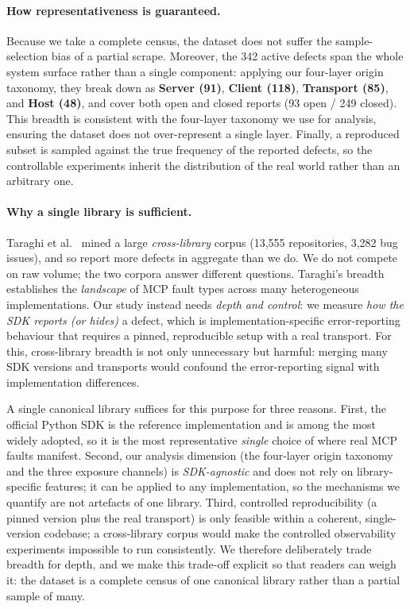 \paragraph{How representativeness is guaranteed.} Because we take a complete census, the
dataset does not suffer the sample-selection bias of a partial scrape. Moreover, the 342
active defects span the whole system surface rather than a single component: applying our
four-layer origin taxonomy, they break down as \textbf{Server (91)}, \textbf{Client (118)},
\textbf{Transport (85)}, and \textbf{Host (48)}, and cover both open and closed reports (93
open / 249 closed). This breadth is consistent with the four-layer taxonomy we use for analysis,
ensuring the dataset does not over-represent a single layer. Finally, a reproduced subset is
sampled against the true frequency of the reported defects, so the controllable experiments
inherit the distribution of the real world rather than an arbitrary one.

\paragraph{Why a single library is sufficient.} Taraghi et al.~\cite{taraghi2026real} mined a
large \emph{cross-library} corpus (13,555 repositories, 3,282 bug issues), and so report more
defects in aggregate than we do. We do not compete on raw volume; the two corpora answer
different questions. Taraghi's breadth establishes the \emph{landscape} of MCP fault types
across many heterogeneous implementations. Our study instead needs \emph{depth and control}: we
measure \emph{how the SDK reports (or hides)} a defect, which is implementation-specific
error-reporting behaviour that requires a pinned, reproducible setup with a real transport.
For this, cross-library breadth is not only unnecessary but harmful: merging many SDK versions
and transports would confound the error-reporting signal with implementation differences.

A single canonical library suffices for this purpose for three reasons. First, the official
Python SDK is the reference implementation and is among the most widely adopted, so it is the
most representative \emph{single} choice of where real MCP faults manifest. Second, our
analysis dimension (the four-layer origin taxonomy and the three exposure channels) is
\emph{SDK-agnostic} and does not rely on library-specific features; it can be applied to any
implementation, so the mechanisms we quantify are not artefacts of one library. Third,
controlled reproducibility (a pinned version plus the real transport) is only feasible within
a coherent, single-version codebase; a cross-library corpus would make the controlled
observability experiments impossible to run consistently. We therefore deliberately trade
breadth for depth, and we make this trade-off explicit so that readers can weigh it: the
dataset is a complete census of one canonical library rather than a partial sample of many.

